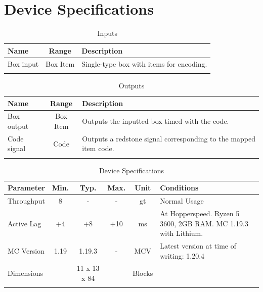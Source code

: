 \documentclass[10pt]{datasheet}
\begin{document}
\onecolumn

\section{Device Specifications}

\begin{table}[h]
    \caption{Inputs}
    \begin{tabularx}{\textwidth}{l | c | X}
        \thickhline
        \textbf{Name} & \textbf{Range} & \textbf{Description} \\
        \hline
        Box input & Box Item & Single-type box with items for encoding. \\
        \thickhline
\end{tabularx}
\end{table}

\begin{table}[h]
    \caption{Outputs}
    \begin{tabularx}{\textwidth}{l | c | X}
        \thickhline
        \textbf{Name} & \textbf{Range} & \textbf{Description} \\
        \hline
        Box output & Box Item & Outputs the inputted box timed with the code. \\
        \hline
        Code signal & Code & Outputs a redstone signal corresponding to the mapped item code. \\
        \thickhline
\end{tabularx}
\end{table}

\begin{table}[h]
    \caption{Device Specifications}
    \begin{tabularx}{\textwidth}{l | c c c | c | X}
        \thickhline
        \textbf{Parameter} & \textbf{Min.} & \textbf{Typ.} & \textbf{Max.} &
        \textbf{Unit} & \textbf{Conditions} \\
        \hline
        Throughput  & 8 & - & - & gt & Normal Usage \\
        \hline
        Active Lag & +4 & +8 & +10 & ms & At Hopperspeed. Ryzen 5 3600, 2GB RAM. MC 1.19.3 with Lithium. \\
        \hline
        MC Version & 1.19 & 1.19.3 & - & MCV & Latest version at time of writing: 1.20.4\\
        \hline
        Dimensions & & 11 x 13 x 84 & & Blocks & \\
        \thickhline
\end{tabularx}
\end{table}
\newpage
\end{document}
